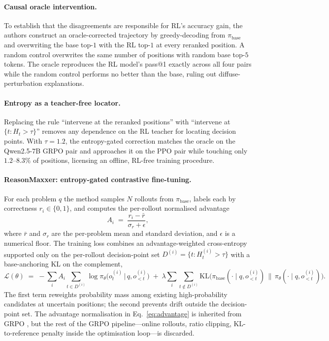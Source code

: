 \documentclass[11pt]{article}
\begin{document}
\paragraph{Causal oracle intervention.}
To establish that the disagreements are responsible for RL's accuracy gain, the authors construct an oracle-corrected trajectory by greedy-decoding from $\pi_{\text{base}}$ and overwriting the base top-$1$ with the RL top-$1$ at every reranked position. A random control overwrites the same number of positions with random base top-$5$ tokens. The oracle reproduces the RL model's pass@1 exactly across all four pairs while the random control performs no better than the base, ruling out diffuse-perturbation explanations.

\paragraph{Entropy as a teacher-free locator.}
Replacing the rule ``intervene at the reranked positions'' with ``intervene at $\{t : H_t > \tau\}$'' removes any dependence on the RL teacher for locating decision points. With $\tau = 1.2$, the entropy-gated correction matches the oracle on the Qwen2.5-7B GRPO pair and approaches it on the PPO pair while touching only $1.2$--$8.3\%$ of positions, licensing an offline, RL-free training procedure.

\paragraph{ReasonMaxxer: entropy-gated contrastive fine-tuning.}
For each problem $q$ the method samples $N$ rollouts from $\pi_{\text{base}}$, labels each by correctness $r_i \in \{0,1\}$, and computes the per-rollout normalised advantage
\begin{equation}
A_i \;=\; \frac{r_i - \bar{r}}{\sigma_r + \epsilon},
\label{eq:advantage}
\end{equation}
where $\bar{r}$ and $\sigma_r$ are the per-problem mean and standard deviation, and $\epsilon$ is a numerical floor. The training loss combines an advantage-weighted cross-entropy supported only on the per-rollout decision-point set $D^{(i)} = \{t : H_t^{(i)} > \tau\}$ with a base-anchoring KL on the complement,
\begin{equation}
\mathcal{L}(\theta) \;=\; -\sum_{i} A_i \!\!\sum_{t \in D^{(i)}} \!\! \log \pi_{\theta}\!\big(o_t^{(i)} \,\big|\, q, o_{<t}^{(i)}\big) \;+\; \lambda \sum_{i} \!\!\sum_{t \notin D^{(i)}} \!\! \mathrm{KL}\!\Big(\pi_{\text{base}}(\cdot \mid q, o_{<t}^{(i)}) \,\Big\|\, \pi_{\theta}(\cdot \mid q, o_{<t}^{(i)})\Big).
\label{eq:loss}
\end{equation}
The first term reweights probability mass among existing high-probability candidates at uncertain positions; the second prevents drift outside the decision-point set. The advantage normalisation in Eq.~\eqref{eq:advantage} is inherited from GRPO \citep{shao2024grpo}, but the rest of the GRPO pipeline---online rollouts, ratio clipping, KL-to-reference penalty inside the optimisation loop---is discarded.
\end{document}
